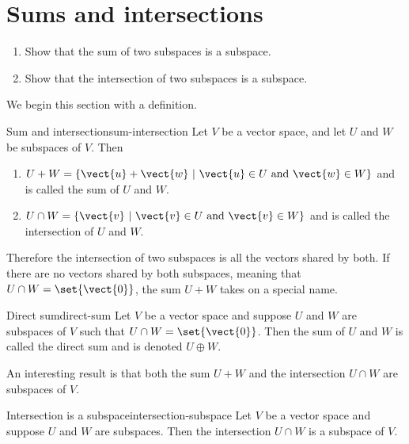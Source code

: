 \section{Sums and intersections}

\begin{outcome}
\begin{enumerate}
\item[A.] Show that the sum of two subspaces is a subspace.

\item[B.] Show that the intersection of two subspaces is a subspace.
\end{enumerate}
\end{outcome}

We begin this section with a definition.

\begin{definition}{Sum and intersection}{sum-intersection}
Let $V$ be a vector space, and let $U$ and $W$ be subspaces of
$V$.  
Then
\begin{enumerate}
\item $U+W = \{\vect{u}+\vect{w} ~|~ \vect{u}\in U\mbox{ and } \vect{w}\in W\}$ and is 
called the sum of $U$ and $W$.

\item $U\cap W = \{\vect{v} ~|~ \vect{v}\in U\mbox{ and } \vect{v}\in W\}$ and is 
called the intersection of $U$ and $W$.
\end{enumerate}
\end{definition}

Therefore the intersection of two subspaces is all the vectors shared by both. If there are no vectors shared by both subspaces, meaning that $U \cap W = \set{\vect{0} }$, the sum $U+W$ takes on a special name.

\begin{definition}{Direct sum}{direct-sum}
Let $V$ be a vector space and suppose $U$ and $W$ are subspaces of $V$ such that  $U \cap W = \set{\vect{0} }$. Then the sum of $U$ and $W$ is called the direct sum and is denoted $U \oplus W$. 
\end{definition}

An interesting result is that both the sum $U + W$ and the intersection $U \cap W$ are subspaces of $V$. 

\begin{example}{Intersection is a subspace}{intersection-subspace}
Let $V$ be a vector space and suppose $U$ and $W$ are subspaces. Then the intersection $U \cap W$ is a subspace of $V$.
\end{example}

